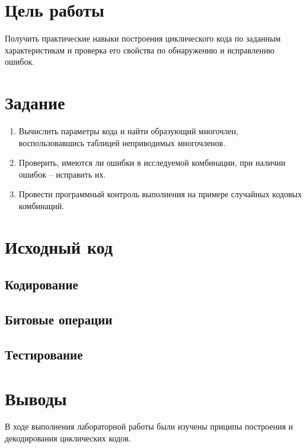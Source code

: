 \documentclass[listings]{labreport}
\begin{document}
\maketitlepage

\section*{Цель работы}

Получить практические навыки построения циклического кода
по заданным характеристикам и проверка его свойства
по обнаружению и исправлению ошибок.

\section*{Задание}

\begin{enumerate}
\item Вычислить параметры кода и найти образующий многочлен,
  воспользовавшись таблицей неприводимых многочленов. 
\item Проверить, имеются ли ошибки в исследуемой комбинации,
  при наличии ошибок – исправить их.
\item Провести программный контроль выполнения
  на примере случайных кодовых комбинаций.
\end{enumerate}

\section*{Исходный код}

\subsection*{Кодирование}



\subsection*{Битовые операции}



\subsection*{Тестирование}



\section*{Выводы}

В ходе выполнения лабораторной работы были изучены приципы построения
и декодирования циклических кодов.
\end{document}
